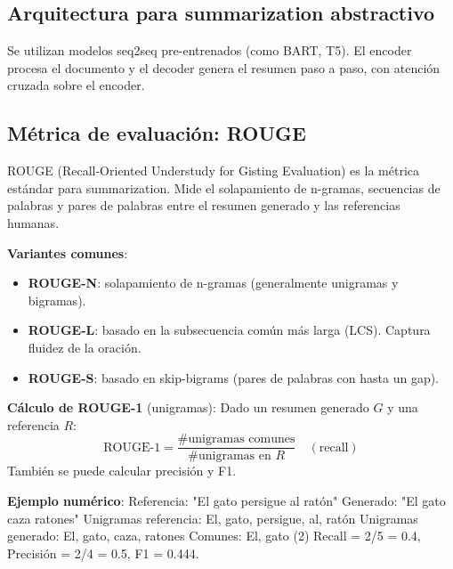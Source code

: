\documentclass[12pt,a4paper,openany,oneside]{book}
\begin{document}
\subsection{Arquitectura para summarization abstractivo}
Se utilizan modelos seq2seq pre-entrenados (como BART, T5). El encoder procesa el documento y el decoder genera el resumen paso a paso, con atención cruzada sobre el encoder.

\begin{center}
\caption{Arquitectura típica para summarization abstractivo.}
\end{center}

\subsection{Métrica de evaluación: ROUGE}
ROUGE (Recall-Oriented Understudy for Gisting Evaluation) es la métrica estándar para summarization. Mide el solapamiento de n-gramas, secuencias de palabras y pares de palabras entre el resumen generado y las referencias humanas.

\textbf{Variantes comunes}:
\begin{itemize}
    \item \textbf{ROUGE-N}: solapamiento de n-gramas (generalmente unigramas y bigramas).
    \item \textbf{ROUGE-L}: basado en la subsecuencia común más larga (LCS). Captura fluidez de la oración.
    \item \textbf{ROUGE-S}: basado en skip-bigrams (pares de palabras con hasta un gap).
\end{itemize}

\textbf{Cálculo de ROUGE-1} (unigramas):
Dado un resumen generado \(G\) y una referencia \(R\):
\[
\text{ROUGE-1} = \frac{\text{\# unigramas comunes}}{\text{\# unigramas en } R} \quad (\text{recall})
\]
También se puede calcular precisión y F1.

\textbf{Ejemplo numérico}:
Referencia: "El gato persigue al ratón"
Generado: "El gato caza ratones"
Unigramas referencia: {El, gato, persigue, al, ratón}
Unigramas generado: {El, gato, caza, ratones}
Comunes: {El, gato} (2)
Recall = 2/5 = 0.4, Precisión = 2/4 = 0.5, F1 = 0.444.
\end{document}
